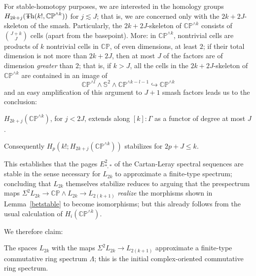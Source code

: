 \documentclass{article}
\newcommand{\CP}{\mathbb{CP}}
\newcommand{\sph}{\mathbb{S}}
\newcommand{\6}{\partial}
\newcommand{\8}{\infty}
\newcommand{\smsh}{\wedge}
\begin{document}
For stable-homotopy purposes, we are interested in the homology groups $H_{2k+j}(\Th(k!,\CP^{\smsh k}))$ for $j\lesssim J$; that is, we are concerned only with the $2k+2J$-skeleton of the smash.  Particularly, the $2k+2J$-skeleton of $\CP^{\smsh k}$ consists of $\binom{J+k}{J}$ cells (apart from the basepoint).  More: in $\CP^{\smsh k}$, nontrivial cells are products of $k$ nontrivial cells in $\CP$, of even dimensions, at least $2$; if their total dimension is not more than $2k+2J$, then at most $J$ of the factors are of dimension {\em greater} than $2$; that is, if $k > J$, all the cells in the $2k+2J$-skeleton of $\CP^{\smsh k}$ are contained in an image of $$ \CP^{\smsh l} \smsh \sph^2 \smsh \CP^{\smsh k-l-1} \hookrightarrow \CP^{\smsh k} $$
and an easy amplification of this argument to $J+1$ smash factors leads us to the conclusion:
\begin{lemma} $H_{2k+j}(\CP^{\smsh k})$, for $j < 2J$, extends along $[k] : \Gamma$ as a functor of degree at most $J$.\end{lemma}
Consequently $H_p(k!;H_{2k+j}(\CP^{\smsh k}))$ stabilizes for $2 p + J \leq k$.

This establishes that the pages $E^2_{*,*}$ of the Cartan-Leray spectral sequences are stable in the sense necessary for $L_{2k}$ to approximate a finite-type spectrum; concluding that $L_{2k}$ themselves stabilize reduces to arguing that the prespectrum maps $\Sigma^2 L_{2k} \to \CP\smsh L_{2k} \to L_{2(k+1)}$ {\em realize} the morphisms shown in \mbox{Lemma \ref{betstable}} to become isomorphisms; but this already follows from the usual calculation of $H_i(\CP^{\smsh k})$. 

We therefore claim:
\begin{theorem} The spaces $L_{2k}$ with the maps $\Sigma^2 L_{2k} \to L_{2(k+1)}$ approximate a finite-type commutative ring spectrum $\Lambda$; this is the initial complex-oriented commutative ring spectrum.\end{theorem}
\end{document}
